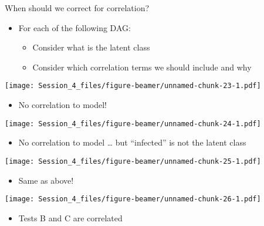 \documentclass[
  ignorenonframetext,
  aspectratio=169,
]{beamer}
\providecommand{\tightlist}{%
  \setlength{\itemsep}{0pt}\setlength{\parskip}{0pt}}
\begin{document}
\begin{frame}{When should we correct for correlation?}
\protect\hypertarget{when-should-we-correct-for-correlation}{}
\begin{itemize}
\item
  For each of the following DAG:

  \begin{itemize}
  \item
    Consider what is the latent class
  \item
    Consider which correlation terms we should include and why
  \end{itemize}
\end{itemize}
\end{frame}

\begin{frame}
\scriptsize\texttt{[image: Session\_4\_files/figure-beamer/unnamed-chunk-23-1.pdf]}
\normalsize

\pause

\begin{itemize}
\tightlist
\item
  No correlation to model!
\end{itemize}
\end{frame}

\begin{frame}
\scriptsize\texttt{[image: Session\_4\_files/figure-beamer/unnamed-chunk-24-1.pdf]}
\normalsize

\pause

\begin{itemize}
\tightlist
\item
  No correlation to model \ldots{} but ``infected'' is not the latent
  class
\end{itemize}
\end{frame}

\begin{frame}
\scriptsize\texttt{[image: Session\_4\_files/figure-beamer/unnamed-chunk-25-1.pdf]}
\normalsize

\pause

\begin{itemize}
\tightlist
\item
  Same as above!
\end{itemize}
\end{frame}

\begin{frame}
\scriptsize\texttt{[image: Session\_4\_files/figure-beamer/unnamed-chunk-26-1.pdf]}
\normalsize

\pause

\begin{itemize}
\tightlist
\item
  Tests B and C are correlated
\end{itemize}
\end{frame}
\end{document}
